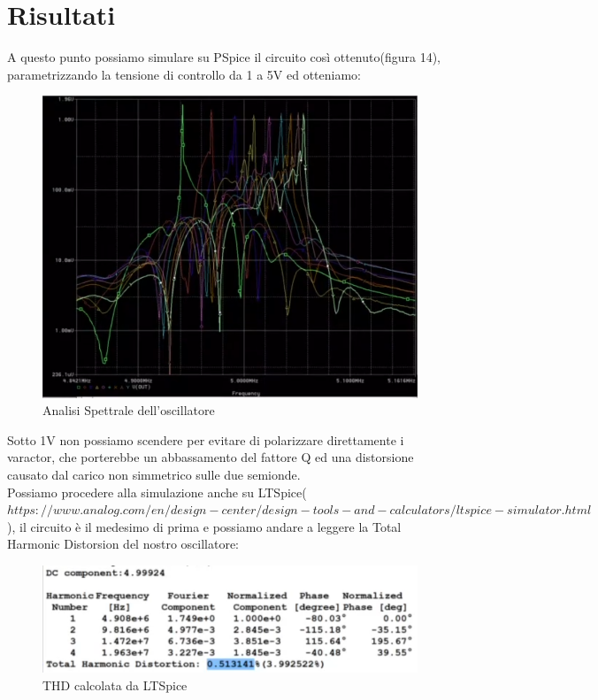 \documentclass{article}
\begin{document}
\section{Risultati}
A questo punto possiamo simulare su PSpice il circuito così ottenuto(figura 14), parametrizzando la tensione di controllo da 1 a 5V ed otteniamo:
~\begin{figure}[H]
\includegraphics[width=\textwidth]{AnalisiSpettraleFinale.png}
\centering
\caption{Analisi Spettrale dell'oscillatore}
\label{fig:foo}
\end{figure}
Sotto 1V non possiamo scendere per evitare di polarizzare direttamente i varactor, che porterebbe un abbassamento del fattore Q ed una distorsione causato dal carico non simmetrico sulle due semionde.\\Possiamo procedere alla simulazione anche su LTSpice($https://www.analog.com/en/design-center/design-tools-and-calculators/ltspice-simulator.html$), il circuito è il medesimo di prima e possiamo andare a leggere la Total Harmonic Distorsion del nostro oscillatore:
~\begin{figure}[H]
\includegraphics[width=\textwidth]{THDLT.png}
\centering
\caption{THD calcolata da LTSpice}
\label{fig:foo}
\end{figure}
\end{document}
